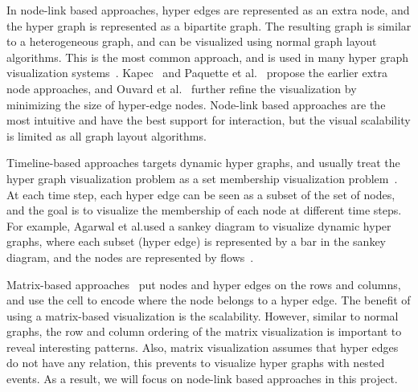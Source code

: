 In node-link based approaches, hyper edges are represented as an extra node, and the hyper graph is represented as a bipartite graph.
The resulting graph is similar to a heterogeneous graph, and can be visualized using normal graph layout algorithms.
This is the most common approach, and is used in many hyper graph visualization systems~\cite{kapec2010visualizing, paquette2011hypergraph, kerren2013radial, ouvrard2017networks, jacobsen2020metrosets}.
Kapec~\cite{kapec2010visualizing} and Paquette et al.~\cite{paquette2011hypergraph} propose the earlier extra node approaches, 
and Ouvard et al.~\cite{ouvrard2017networks} further refine the visualization by minimizing the size of hyper-edge nodes.
Node-link based approaches are the most intuitive and have the best support for interaction, but the visual scalability is limited as all graph layout algorithms.

Timeline-based approaches targets dynamic hyper graphs, and usually treat the hyper graph visualization problem as a set membership visualization problem~\cite{agarwal2020setstreams, nguyen2016timesets, valdivia2019analyzing}.
At each time step, each hyper edge can be seen as a subset of the set of nodes, and the goal is to visualize the membership of each node at different time steps.
For example, Agarwal et al.used a sankey diagram to visualize dynamic hyper graphs, where each subset (hyper edge) is represented by a bar in the sankey diagram, and the nodes are represented by flows~\cite{agarwal2020setstreams}.

Matrix-based approaches~\cite{streeb2019visual, fischer2020visual} put nodes and hyper edges on the rows and columns, and use the cell to encode where the node belongs to a hyper edge.
The benefit of using a matrix-based visualization is the scalability. 
However, similar to normal graphs, the row and column ordering of the matrix visualization is important to reveal interesting patterns.
Also, matrix visualization assumes that hyper edges do not have any relation, this prevents to visualize hyper graphs with nested events.
As a result, we will focus on node-link based approaches in this project.






